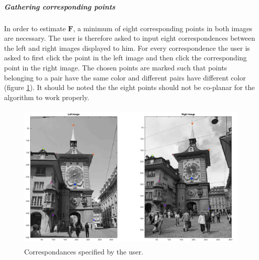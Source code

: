 \documentclass{paper}
\begin{document}
\subparagraph{Gathering corresponding points}
In order to estimate $\mathbf{F}$, a minimum of eight corresponding points in both images are necessary. The user is therefore asked to input eight correspondences between the left and right images displayed to him. For every correspondence the user is asked to first click the point in the left image and then click the corresponding point in the right image. The chosen points are marked such that points belonging to a pair have the same color and different pairs have different color (figure \ref{fig:corresp}). It should be noted the the eight points should not be co-planar for the algorithm to work properly.
\begin{figure}[h!]
   \centering
   \includegraphics[height=2.8in]{corresp}
        \caption{Correspondances specified by the user.}
\label{fig:corresp}
\end{figure}
\end{document}
